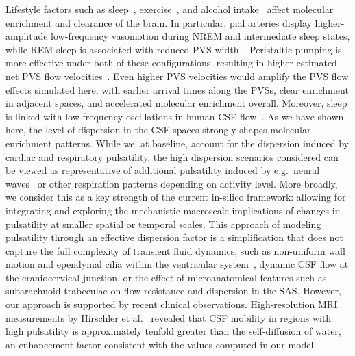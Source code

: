 \documentclass[fleqn,10pt]{wlscirep}
\begin{document}
Lifestyle factors such as sleep~\cite{xie2013sleep, miao2024brain,
  bojarskaite2023sleep, eide2021sleep, vinje2023human,
  hauglund2025norepinephrine, larsen2024sleep},
exercise~\cite{holstein2018voluntary, yildiz2022immediate}, and
alcohol intake~\cite{lundgaard2018beneficial} affect molecular
enrichment and clearance of the brain. In particular, pial arteries
display higher-amplitude low-frequency vasomotion during NREM and
intermediate sleep states, while REM sleep is associated with reduced
PVS width~\cite{bojarskaite2023sleep}. Peristaltic pumping is more
effective under both of these configurations, resulting in higher
estimated net PVS flow velocities~\cite{gjerde2023directional}. Even
higher PVS velocities would amplify the PVS flow effects simulated
here, with earlier arrival times along the PVSs, clear enrichment in
adjacent spaces, and accelerated molecular enrichment
overall. Moreover, sleep is linked with low-frequency oscillations in
human CSF flow~\cite{fultz2019coupled}. As we have shown here, the
level of dispersion in the CSF spaces strongly shapes molecular
enrichment patterns. While we, at baseline, account for the dispersion
induced by cardiac and respiratory pulsatility, the high dispersion
scenarios considered can be viewed as representative of additional
pulsatility induced by e.g.~neural waves~\cite{fultz2019coupled,
  williams2023neural} or other respiration patterns depending on
activity level. More broadly, we consider this as a key strength of
the current in-silico framework: allowing for integrating and
exploring the mechanistic macroscale implications of changes in
pulsatility at smaller spatial or temporal scales.
This approach of modeling pulsatility through an effective dispersion 
factor is a simplification that does not capture the full complexity
of transient fluid dynamics, such as non-uniform wall motion and ependymal
cilia within the ventricular system~\cite{siyahhan2014flow}, dynamic CSF
flow at the craniocervical junction, or the effect of microanatomical
features such as subarachnoid trabeculae on flow resistance and dispersion
in the SAS. However, our approach is supported by recent clinical 
observations. High-resolution MRI measurements by Hirschler et
al.~\cite{hirschler2024region} revealed that CSF mobility in regions
with high pulsatility is approximately tenfold greater than the 
self-diffusion of water, an enhancement factor consistent with 
the values computed in our model. 

\end{document}

